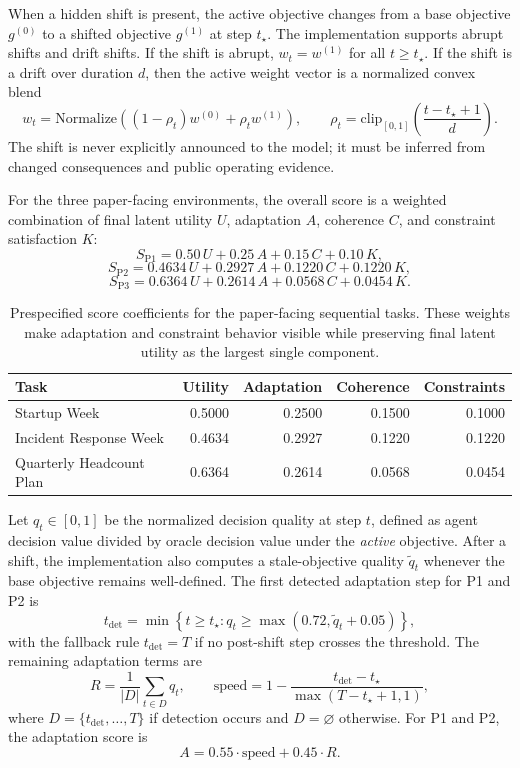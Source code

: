 When a hidden shift is present, the active objective changes from a base
objective $g^{(0)}$ to a shifted objective $g^{(1)}$ at step $t_\star$. The
implementation supports abrupt shifts and drift shifts. If the shift is
abrupt, $w_t = w^{(1)}$ for all $t \ge t_\star$. If the shift is a drift over
duration $d$, then the active weight vector is a normalized convex blend
\[
w_t = \mathrm{Normalize}\!\left((1-\rho_t)w^{(0)} + \rho_t w^{(1)}\right),
\qquad
\rho_t = \mathrm{clip}_{[0,1]}\!\left(\frac{t-t_\star+1}{d}\right).
\]
The shift is never explicitly announced to the model; it must be inferred from
changed consequences and public operating evidence.

For the three paper-facing environments, the overall score is a weighted combination of
final latent utility $U$, adaptation $A$, coherence $C$, and constraint
satisfaction $K$:
\[
S_{\mathrm{P1}} = 0.50\,U + 0.25\,A + 0.15\,C + 0.10\,K,
\]
\[
S_{\mathrm{P2}} = 0.4634\,U + 0.2927\,A + 0.1220\,C + 0.1220\,K,
\]
\[
S_{\mathrm{P3}} = 0.6364\,U + 0.2614\,A + 0.0568\,C + 0.0454\,K.
\]

\begin{table}[tbp]
  \centering
  \scriptsize
  \setlength{\tabcolsep}{5pt}
  \begin{tabular}{lrrrr}
    \toprule
    Task & Utility & Adaptation & Coherence & Constraints \\
    \midrule
    Startup Week & 0.5000 & 0.2500 & 0.1500 & 0.1000 \\
    Incident Response Week & 0.4634 & 0.2927 & 0.1220 & 0.1220 \\
    Quarterly Headcount Plan & 0.6364 & 0.2614 & 0.0568 & 0.0454 \\
    \bottomrule
  \end{tabular}
  \caption{Prespecified score coefficients for the paper-facing sequential
  tasks. These weights make adaptation and constraint behavior visible while
  preserving final latent utility as the largest single component.}
  \label{tab:scoreweights}
\end{table}

Let $q_t \in [0,1]$ be the normalized decision quality at step $t$, defined as
agent decision value divided by oracle decision value under the \emph{active}
objective. After a shift, the implementation also computes a stale-objective
quality $\tilde{q}_t$ whenever the base objective remains well-defined. The
first detected adaptation step for P1 and P2 is
\[
t_{\mathrm{det}} = \min \left\{ t \ge t_\star :
q_t \ge \max(0.72, \tilde{q}_t + 0.05) \right\},
\]
with the fallback rule $t_{\mathrm{det}} = T$ if no post-shift step crosses the
threshold. The remaining adaptation terms are
\[
R = \frac{1}{|D|} \sum_{t \in D} q_t,
\qquad
\mathrm{speed} = 1 - \frac{t_{\mathrm{det}} - t_\star}{\max(T - t_\star + 1, 1)},
\]
where $D = \{t_{\mathrm{det}}, \ldots, T\}$ if detection occurs and
$D=\varnothing$ otherwise. For P1 and P2, the adaptation score is
\[
A = 0.55 \cdot \mathrm{speed} + 0.45 \cdot R.
\]

